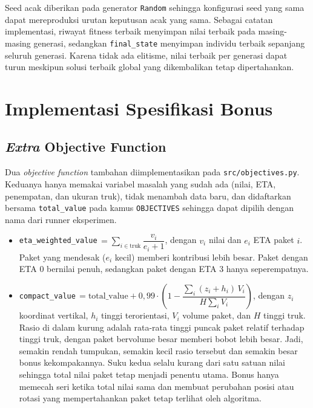 Seed acak diberikan pada generator \texttt{Random} sehingga konfigurasi seed yang sama dapat mereproduksi urutan keputusan acak yang sama. Sebagai catatan implementasi, riwayat fitness terbaik menyimpan nilai terbaik pada masing-masing generasi, sedangkan \texttt{final\_state} menyimpan individu terbaik sepanjang seluruh generasi. Karena tidak ada elitisme, nilai terbaik per generasi dapat turun meskipun solusi terbaik global yang dikembalikan tetap dipertahankan.


\section{Implementasi Spesifikasi Bonus}

\subsection{\textit{Extra} Objective Function}

Dua \textit{objective function} tambahan diimplementasikan pada \texttt{src/\allowbreak objectives.py}. Keduanya hanya memakai variabel masalah yang sudah ada (nilai, ETA, penempatan, dan ukuran truk), tidak menambah data baru, dan didaftarkan bersama \texttt{total\_value} pada kamus \texttt{OBJECTIVES} sehingga dapat dipilih dengan nama dari runner eksperimen.

\begin{itemize}
    \item \texttt{eta\_weighted\_value}\,$=\sum_{i\in\text{truk}} \dfrac{v_i}{e_i+1}$, dengan $v_i$ nilai dan $e_i$ ETA paket $i$. Paket yang mendesak ($e_i$ kecil) memberi kontribusi lebih besar. Paket dengan ETA 0 bernilai penuh, sedangkan paket dengan ETA 3 hanya seperempatnya.
    \item \texttt{compact\_value}\,$=\text{total\_value} + 0{,}99\cdot\left(1-\dfrac{\sum_i (z_i+h_i)\,V_i}{H\sum_i V_i}\right)$, dengan $z_i$ koordinat vertikal, $h_i$ tinggi terorientasi, $V_i$ volume paket, dan $H$ tinggi truk. Rasio di dalam kurung adalah rata-rata tinggi puncak paket relatif terhadap tinggi truk, dengan paket bervolume besar memberi bobot lebih besar. Jadi, semakin rendah tumpukan, semakin kecil rasio tersebut dan semakin besar bonus kekompakannya. Suku kedua selalu kurang dari satu satuan nilai sehingga total nilai paket tetap menjadi penentu utama. Bonus hanya memecah seri ketika total nilai sama dan membuat perubahan posisi atau rotasi yang mempertahankan paket tetap terlihat oleh algoritma.
\end{itemize}


